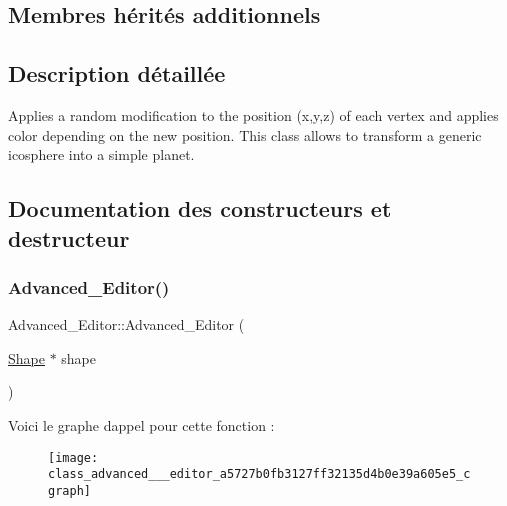 \subsection*{Membres hérités additionnels}


\subsection{Description détaillée}
Applies a random modification to the position (x,y,z) of each vertex and applies color depending on the new position. This class allows to transform a generic icosphere into a simple planet. 

\subsection{Documentation des constructeurs et destructeur}
\mbox{\label{class_advanced___editor_a5727b0fb3127ff32135d4b0e39a605e5}} 
\subsubsection{\texorpdfstring{Advanced\+\_\+\+Editor()}{Advanced\_Editor()}}
{\footnotesize\ttfamily Advanced\+\_\+\+Editor\+::\+Advanced\+\_\+\+Editor (\begin{DoxyParamCaption}\item[{\hyperlink{class_shape}{Shape} $\ast$}]{shape }\end{DoxyParamCaption})\hspace{0.3cm}{\ttfamily [inline]}}

Voici le graphe d\textquotesingle{}appel pour cette fonction \+:\nopagebreak
\begin{figure}[H]
\begin{center}
\leavevmode
\texttt{[image: class\_advanced\_\_\_editor\_a5727b0fb3127ff32135d4b0e39a605e5\_cgraph]}
\end{center}
\end{figure}
\mbox{\label{class_advanced___editor_ade8499e109f05ddbb4430f12a9cd12d2}} 
